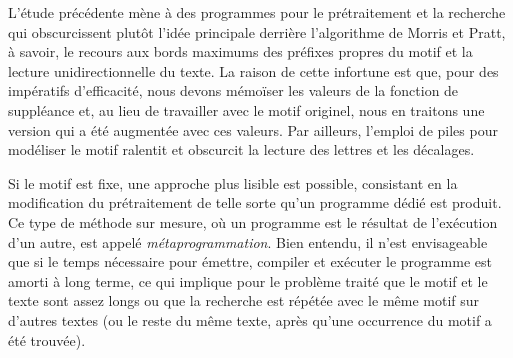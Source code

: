 \vspace*{-10pt}


L'étude précédente mène à des programmes pour le prétraitement et la
recherche qui obscurcissent plutôt l'idée principale derrière
l'algorithme de Morris et Pratt, à savoir, le recours aux bords
maximums des préfixes propres du motif et la lecture unidirectionnelle
du texte. La raison de cette infortune est que, pour des impératifs
d'efficacité, nous devons mémoïser les valeurs de
la fonction de suppléance et, au lieu de travailler avec le motif
originel, nous en traitons une version qui a été augmentée avec ces
valeurs. Par ailleurs, l'emploi de piles pour modéliser le motif
ralentit et obscurcit la lecture des lettres et les décalages.

Si le motif est fixe, une approche plus lisible est possible,
consistant en la modification du prétraitement de telle sorte qu'un
programme dédié est produit. Ce type de méthode sur mesure, où un
programme est le résultat de l'exécution d'un autre, est appelé
\emph{métaprogrammation}. Bien entendu, il
n'est envisageable que si le temps nécessaire pour émettre, compiler
et exécuter le programme est amorti à long terme, ce qui implique pour
le problème traité que le motif et le texte sont assez longs ou que la
recherche est répétée avec le même motif sur d'autres textes (ou le
reste du même texte, après qu'une occurrence du motif a été trouvée).

